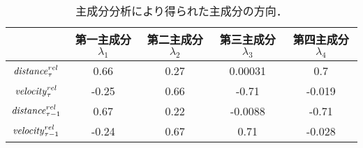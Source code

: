 \begin{table}[h]
  \centering
    \begin{tabular}{|c||c|c|c|c|} \hline
       & 第一主成分$\lambda_1$ & 第二主成分$\lambda_2$ & 第三主成分$\lambda_3$ & 第四主成分$\lambda_4$ \\ \hline
      $\mathit{distance}_{\tau}^{rel}$ & 0.66 & 0.27 & 0.00031 & 0.7 \\ \hline
      $\mathit{velocity}_{\tau}^{rel}$ & -0.25 & 0.66 & -0.71 & -0.019 \\ \hline
      $\mathit{distance}_{\tau-1}^{rel}$ & 0.67 & 0.22 & -0.0088 & -0.71 \\ \hline
      $\mathit{velocity}_{\tau-1}^{rel}$ & -0.24 & 0.67 & 0.71 & -0.028 \\ \hline
    \end{tabular}
  \caption{主成分分析により得られた主成分の方向．}
  \label{tab:pca_components}
\end{table}
